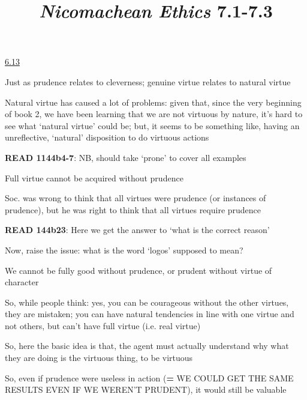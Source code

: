 \documentclass[11pt]{article}
\title{\emph{Nicomachean Ethics} 7.1-7.3}
\author{}
\date{}
\begin{document}
\maketitle

\noindent\underline{6.13}
\vspace*{4mm}

\noindent Just as prudence relates to cleverness; genuine virtue relates to natural virtue
\vspace*{2mm}

\noindent Natural virtue has caused a lot of problems: given that, since the very beginning of book 2, we have been learning that we are not virtuous by nature, it's hard to see what `natural virtue' could be; but, it seems to be something like, having an unreflective, `natural' disposition to do virtuous actions
\vspace*{2mm}

\noindent\textbf{READ 1144b4-7}: NB, should take `prone' to cover all examples
\vspace*{2mm}

\noindent Full virtue cannot be acquired without prudence
\vspace*{2mm}

\noindent Soc. was wrong to think that all virtues were prudence (or instances of prudence), but he was right to think that all virtues require prudence
\vspace*{2mm}

\noindent\textbf{READ 144b23}: Here we get the answer to `what is the correct reason'
\vspace*{2mm}

\noindent Now, raise the issue: what is the word `logos' supposed to mean?
\vspace*{2mm}

\noindent We cannot be fully good without prudence, or prudent without virtue of character
\vspace*{2mm}

\noindent So, while people think: yes, you can be courageous without the other virtues, they are mistaken; you can have natural tendencies in line with one virtue and not others, but can't have full virtue (i.e. real virtue)
\vspace*{2mm}

\noindent So, here the basic idea is that, the agent must actually understand why what they are doing is the virtuous thing, to be virtuous
\vspace*{2mm}

\noindent So, even if prudence were useless in action (\textbf= WE COULD GET THE SAME RESULTS EVEN IF WE WEREN'T PRUDENT), it would still be valuable
\end{document}
